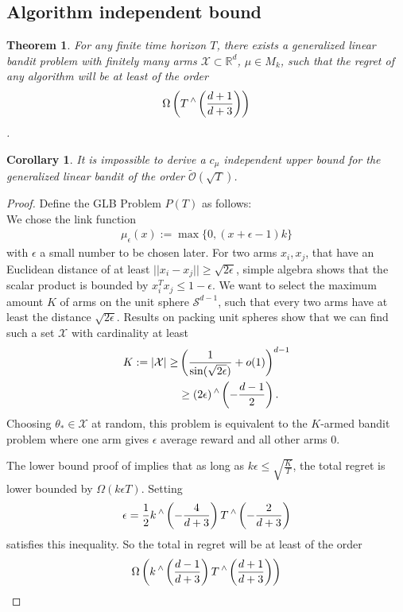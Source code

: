 \documentclass[twoside]{article} \usepackage{aistats2017}
\DeclareMathOperator\caret{\raisebox{1ex}{$\scriptstyle\wedge$}}
\newtheorem{theorem}{Theorem}
\newtheorem{corollary}{Corollary}[theorem]
\begin{document}
\subsection{Algorithm independent bound}
\begin{theorem}
For any finite time horizon $T$, there exists a generalized linear bandit problem with finitely many arms $\mathcal{X}\subset\mathbb{R}^d$, $\mu\in M_k$, such that the regret of any algorithm will be at least of the order
$$\Omega\left(T\caret\left(\frac{d+1}{d+3}\right)\right)$$.
\end{theorem}
\begin{corollary}
It is impossible to derive a $c_\mu$ independent upper bound for the generalized linear bandit of the order $\tilde{\mathcal{O}}(\sqrt{T})$.
\end{corollary}
\begin{proof}
    Define the GLB Problem $P(T)$ as follows:\\
    We chose the link function 
    \begin{align}
        \mu_\epsilon(x) := \max\{0, (x+\epsilon-1)k\}
    \end{align}
    with $\epsilon$ a small number to be chosen later. For two arms $x_i,x_j$, that have an Euclidean distance of at least $||x_i-x_j||\geq\sqrt{2\epsilon}$, simple algebra shows that the scalar product is bounded by $x_i^Tx_j \leq 1-\epsilon$. We want to select the maximum amount $K$ of arms on the unit sphere $\mathcal{S}^{d-1}$, such that every two arms have at least the distance $\sqrt{2\epsilon}$. Results on packing
     unit spheres \cite{shannon59} \cite{wyner65} show that we can find such a set $\mathcal{X}$ with cardinality at least
     \begin{align*}
     K:=|\mathcal{X}| \geq& \left(\frac{1}{\sin(\sqrt{2\epsilon})}+o(1)\right)^{d-1}\\
     &\geq (2\epsilon)\caret\left(-\frac{d-1}{2}\right).
     \end{align*}
     Choosing $\theta_*\in \mathcal{X}$ at random, this problem is equivalent to the $K$-armed bandit problem where one arm gives $\epsilon$ average reward and all other arms $0$.
     
     The lower bound proof of \cite{Auer} implies that as long as $k\epsilon\leq \sqrt{\frac{K}{T}}$, the total regret is lower bounded by $\Omega(k\epsilon T)$. Setting
     $$\epsilon = \frac{1}{2}k\caret\left(-\frac{4}{d+3}\right)T\caret\left(-\frac{2}{d+3}\right)$$
     satisfies this inequality. So the total in regret will be at least of the order
     $$\Omega \left(k\caret\left(\frac{d-1}{d+3}\right)T\caret\left(\frac{d+1}{d+3}\right)\right)$$
    
\end{proof}
\end{document}
